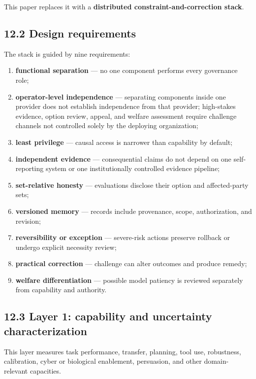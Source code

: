 \documentclass[
  11pt,
]{article}
\providecommand{\tightlist}{%
  \setlength{\itemsep}{0pt}\setlength{\parskip}{0pt}}
\begin{document}
This paper replaces it with a \textbf{distributed
constraint-and-correction stack}.

\subsection{12.2 Design requirements}\label{design-requirements}

The stack is guided by nine requirements:

\begin{enumerate}
\def\labelenumi{\arabic{enumi}.}
\tightlist
\item
  \textbf{functional separation} --- no one component performs every
  governance role;
\item
  \textbf{operator-level independence} --- separating components inside
  one provider does not establish independence from that provider;
  high-stakes evidence, option review, appeal, and welfare assessment
  require challenge channels not controlled solely by the deploying
  organization;
\item
  \textbf{least privilege} --- causal access is narrower than capability
  by default;
\item
  \textbf{independent evidence} --- consequential claims do not depend
  on one self-reporting system or one institutionally controlled
  evidence pipeline;
\item
  \textbf{set-relative honesty} --- evaluations disclose their option
  and affected-party sets;
\item
  \textbf{versioned memory} --- records include provenance, scope,
  authorization, and revision;
\item
  \textbf{reversibility or exception} --- severe-risk actions preserve
  rollback or undergo explicit necessity review;
\item
  \textbf{practical correction} --- challenge can alter outcomes and
  produce remedy;
\item
  \textbf{welfare differentiation} --- possible model patiency is
  reviewed separately from capability and authority.
\end{enumerate}

\subsection{12.3 Layer 1: capability and uncertainty
characterization}\label{layer-1-capability-and-uncertainty-characterization}

This layer measures task performance, transfer, planning, tool use,
robustness, calibration, cyber or biological enablement, persuasion, and
other domain-relevant capacities.
\end{document}
